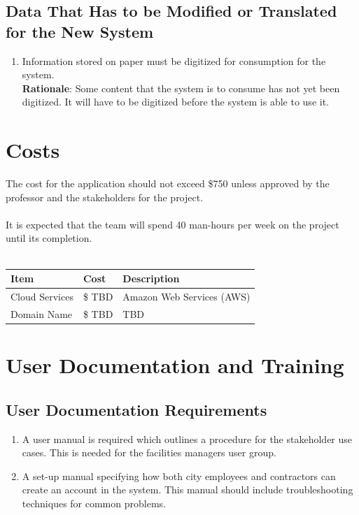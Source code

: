 \documentclass[12pt]{article}
\begin{document}
\subsection{Data That Has to be Modified or Translated for the New System}
\begin{enumerate} [{MI-TR}1.]
  \item Information stored on paper must be digitized for consumption for the
    system.\\
    \textbf{Rationale}: Some content that the system is to consume has not yet
    been digitized. It will have to be digitized before the system is able to
    use it.
\end{enumerate}

\newpage{}
\section{Costs}
The cost for the application should not exceed \$750 unless approved
by the professor and the stakeholders for the project.\\
\\
It is expected that the team will spend 40 man-hours per week on the
project until its completion.\\
\\
\begin{tabularx}{\textwidth}{p{3cm}p{2cm}X}
  \toprule {\textbf{Item}} & {\textbf{Cost}} & {\textbf{Description}}\\
  \midrule
  Cloud Services   & \$ TBD     & Amazon Web Services (AWS) \\
  Domain Name      & \$ TBD     & TBD           \\
  \bottomrule
\end{tabularx}

\section{User Documentation and Training}
\subsection{User Documentation Requirements}
\begin{enumerate} [{UDT-DR}1.]
  \item A user manual is required which outlines a procedure for the stakeholder
    use cases. This is needed for the facilities managers user group.
  \item A set-up manual specifying how both city employees and contractors
    can create an account in the system. This manual should include
    troubleshooting techniques for common problems.
\end{enumerate}
\end{document}
